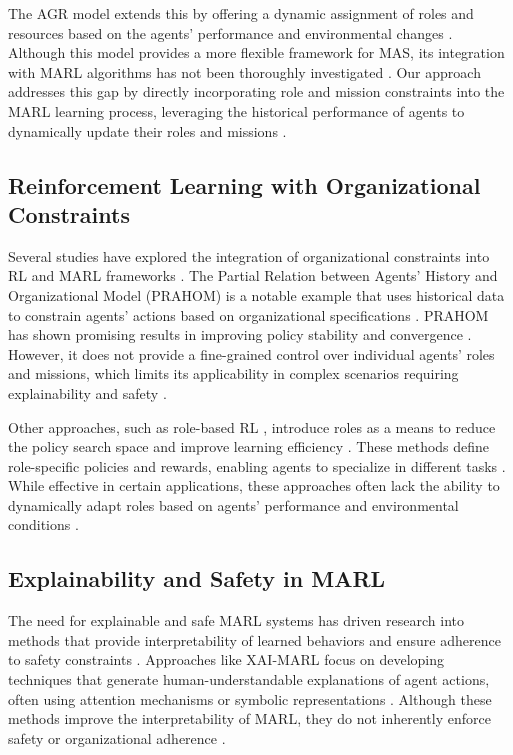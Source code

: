 \documentclass[sigconf,anonymous]{aamas}
\begin{document}
The AGR model \cite{agr_reference} extends this by offering a dynamic assignment of roles and resources based on the agents' performance and environmental changes \cite{hernandez2019survey}. Although this model provides a more flexible framework for MAS, its integration with MARL algorithms has not been thoroughly investigated \cite{hubner2010moise}. Our approach addresses this gap by directly incorporating role and mission constraints into the MARL learning process, leveraging the historical performance of agents to dynamically update their roles and missions \cite{foerster2018counterfactual, soule2024}.

\subsection{Reinforcement Learning with Organizational Constraints}
Several studies have explored the integration of organizational constraints into RL and MARL frameworks \cite{hernandez2019survey}. The Partial Relation between Agents' History and Organizational Model (PRAHOM) \cite{prahom_reference} is a notable example that uses historical data to constrain agents' actions based on organizational specifications \cite{hubner2010moise}. PRAHOM has shown promising results in improving policy stability and convergence \cite{hernandez2019survey}. However, it does not provide a fine-grained control over individual agents' roles and missions, which limits its applicability in complex scenarios requiring explainability and safety \cite{ghosal2021explainable}.

Other approaches, such as role-based RL \cite{role_based_rl_reference}, introduce roles as a means to reduce the policy search space and improve learning efficiency \cite{foerster2018counterfactual}. These methods define role-specific policies and rewards, enabling agents to specialize in different tasks \cite{hernandez2019survey}. While effective in certain applications, these approaches often lack the ability to dynamically adapt roles based on agents' performance and environmental conditions \cite{hubner2010moise, soule2024}.

\subsection{Explainability and Safety in MARL}
The need for explainable and safe MARL systems has driven research into methods that provide interpretability of learned behaviors and ensure adherence to safety constraints \cite{bastani2018verifiable, ghosal2021explainable}. Approaches like XAI-MARL \cite{xai_marl_reference} focus on developing techniques that generate human-understandable explanations of agent actions, often using attention mechanisms or symbolic representations \cite{ghosal2021explainable, su2021toward}. Although these methods improve the interpretability of MARL, they do not inherently enforce safety or organizational adherence \cite{bastani2018verifiable}.
\end{document}
